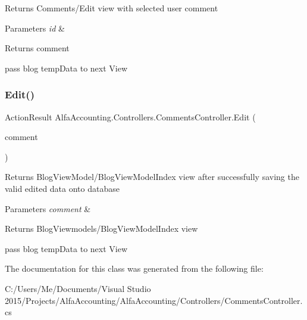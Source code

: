 Returns Comments/\+Edit view with selected user comment 


\begin{DoxyParams}{Parameters}
{\em id} & \\
\hline
\end{DoxyParams}
\begin{DoxyReturn}{Returns}
comment
\end{DoxyReturn}
pass blog temp\+Data to next View \mbox{\label{class_alfa_accounting_1_1_controllers_1_1_comments_controller_a13d26382297b8f6934fcace5d3393c3d}} 
\subsubsection{\texorpdfstring{Edit()}{Edit()}\hspace{0.1cm}{\footnotesize\ttfamily [2/2]}}
{\footnotesize\ttfamily Action\+Result Alfa\+Accounting.\+Controllers.\+Comments\+Controller.\+Edit (\begin{DoxyParamCaption}\item[{\mbox{[}\+Bind(\+Include = \char`\"{}\+Comment\+Id,\+Commented\+Date,\+Comment\+Title,\+Comment\+Body,\+Blog\+Id,\+Id\char`\"{})\mbox{]} Comment}]{comment }\end{DoxyParamCaption})}



Returns Blog\+View\+Model/\+Blog\+View\+Model\+Index view after successfully saving the valid edited data onto database 


\begin{DoxyParams}{Parameters}
{\em comment} & \\
\hline
\end{DoxyParams}
\begin{DoxyReturn}{Returns}
Blog\+Viewmodels/\+Blog\+View\+Model\+Index view
\end{DoxyReturn}
pass blog temp\+Data to next View 

The documentation for this class was generated from the following file\+:\begin{DoxyCompactItemize}
\item 
C\+:/\+Users/\+Me/\+Documents/\+Visual Studio 2015/\+Projects/\+Alfa\+Accounting/\+Alfa\+Accounting/\+Controllers/Comments\+Controller.\+cs\end{DoxyCompactItemize}
